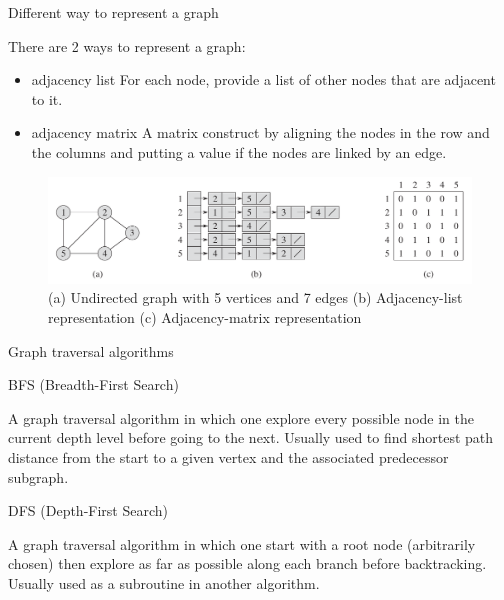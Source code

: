 \documentclass[ignorenonframetext,]{beamer}
\providecommand{\tightlist}{%
  \setlength{\itemsep}{0pt}\setlength{\parskip}{0pt}}
\begin{document}
\begin{frame}{Different way to represent a graph}
\protect\hypertarget{different-way-to-represent-a-graph}{}

There are 2 ways to represent a graph:

\begin{itemize}
\tightlist
\item
  adjacency list For each node, provide a list of other nodes that are
  adjacent to it.
\item
  adjacency matrix A matrix construct by aligning the nodes in the row
  and the columns and putting a value if the nodes are linked by an
  edge.
\end{itemize}

\begin{figure}
\centering
\includegraphics{graph-representation.png}
\caption{(a) Undirected graph with 5 vertices and 7 edges (b)
Adjacency-list representation (c) Adjacency-matrix representation}
\end{figure}

\end{frame}

\begin{frame}{Graph traversal algorithms}
\protect\hypertarget{graph-traversal-algorithms}{}

\begin{block}{BFS (Breadth-First Search)}

A graph traversal algorithm in which one explore every possible node in
the current depth level before going to the next. Usually used to find
shortest path distance from the start to a given vertex and the
associated predecessor subgraph.

\end{block}

\begin{block}{DFS (Depth-First Search)}

A graph traversal algorithm in which one start with a root node
(arbitrarily chosen) then explore as far as possible along each branch
before backtracking. Usually used as a subroutine in another algorithm.

\end{block}

\end{frame}
\end{document}
